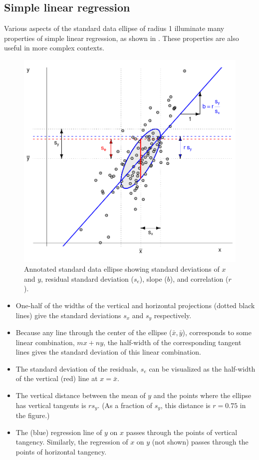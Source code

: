\subsection{Simple linear regression}

Various aspects of the standard data ellipse of radius 1 illuminate many properties
of simple linear regression, as shown in .
These properties are also useful in more complex contexts.

\begin{figure}[htb]
  \centering
  \includegraphics[width=.6\textwidth,clip]{fig/ellipses-demo}
  \caption{Annotated standard data ellipse showing standard deviations of $x$ and $y$, residual
  standard deviation ($s_e$), slope ($b$), and correlation ($r$).
  }%
  \label{fig:ellipses-demo}
\end{figure}

\begin{itemize}
  \item One-half of the widths of the vertical and horizontal projections (dotted black lines)
  give the standard deviations $s_x$ and $s_y$ respectively.
  \item Because any line through the center of the ellipse ($\bar{x}, \bar{y}$), corresponds to
  some linear combination, $m x + n y$, the half-width of the corresponding tangent lines
  gives the standard deviation of this linear combination.
  \item The standard deviation of the residuals, $s_e$ can be visualized as the half-width of the vertical
  (red) line at $x=\bar{x}$.
  \item The vertical distance between the mean of $y$ and the points where the ellipse has vertical
  tangents is $r s_y$. (As a fraction of $s_y$, this distance is $r = 0.75$ in the figure.)
  \item The (blue) regression line of $y$ on $x$ passes through the points of vertical tangency.
  Similarly, the regression of $x$ on $y$ (not shown) passes through the points of
  horizontal tangency.

\end{itemize}


